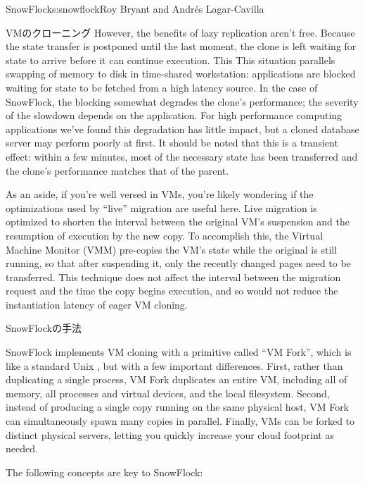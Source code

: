 \begin{aosachapter}{SnowFlock}{s:snowflock}{Roy Bryant and Andr\'e{s} Lagar-Cavilla}
\begin{aosasect1}{VMのクローニング}
However, the benefits of lazy replication aren't free. Because the
state transfer is postponed until the last moment, the clone is left
waiting for state to arrive before it can continue execution. This
This situation parallels swapping of memory to disk in time-shared workstation:
applications are blocked waiting for state to be fetched from a high latency source.
In the case of SnowFlock, the
blocking somewhat degrades the clone's performance; the severity of
the slowdown depends on the application.  For high performance
computing applications we've found this degradation has little impact,
but a cloned database server may perform poorly at first. It should be
noted that this is a transient effect: within a few minutes, most of
the necessary state has been transferred and the clone's performance
matches that of the parent.

As an aside, if you're well versed in VMs, you're likely wondering if
the optimizations used by ``live'' migration are useful here. Live
migration is optimized to shorten the interval between the original
VM's suspension and the resumption of execution by the new copy.  To
accomplish this, the Virtual Machine Monitor (VMM) pre-copies the VM's state while the original
is still running, so that after suspending it, only the recently
changed pages need to be transferred. This technique does not affect
the interval between the migration request and the time the copy
begins execution, and so would not reduce the instantiation latency of
eager VM cloning.

\end{aosasect1}

\begin{aosasect1}{SnowFlockの手法}

SnowFlock implements VM cloning with a primitive called ``VM Fork'',
which is like a standard Unix , but with a few
important differences.  First, rather than duplicating a single
process, VM Fork duplicates an entire VM, including all of memory, all
processes and virtual devices, and the local filesystem.  Second,
instead of producing a single copy running on the same physical host,
VM Fork can simultaneously spawn many copies in parallel. Finally, VMs
can be forked to distinct physical servers, letting you quickly
increase your cloud footprint as needed.

The following concepts are key to SnowFlock:

\begin{aosaitemize}


\end{aosaitemize}
\end{aosasect1}
\end{aosachapter}
